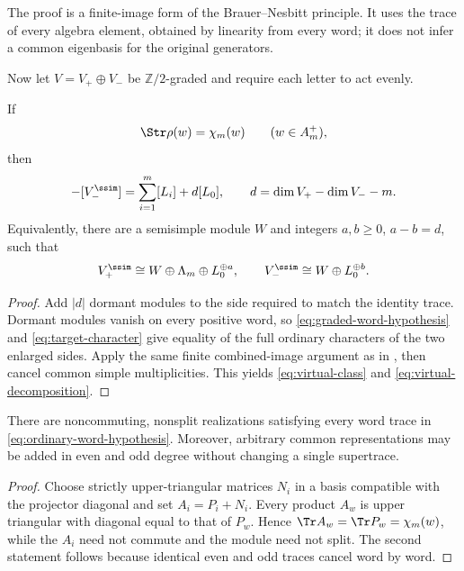 The proof is a finite-image form of the Brauer--Nesbitt principle.  It uses
the trace of every algebra element, obtained by linearity from every word; it
does not infer a common eigenbasis for the original generators.

Now let \(V=V_+\oplus V_-\) be \(\mathbb Z/2\)-graded and require each letter
to act evenly.

\begin{theorem}
\label{thm:graded-rigidity}
If
\begin{equation}
 \Str\rho(w)=\chi_m(w)\qquad(w\in A_m^+),
 \label{eq:graded-word-hypothesis}
\end{equation}
then
\begin{equation}
 [V_+^{\ssim}]-[V_-^{\ssim}]
 =\sum_{i=1}^m[L_i]+d[L_0],
 \qquad d=\dim V_+-\dim V_- -m.
 \label{eq:virtual-class}
\end{equation}
Equivalently, there are a semisimple module \(W\) and integers \(a,b\ge0\),
\(a-b=d\), such that
\begin{equation}
 V_+^{\ssim}\cong W\oplus\Lambda_m\oplus L_0^{\oplus a},
 \qquad
 V_-^{\ssim}\cong W\oplus L_0^{\oplus b}.
 \label{eq:virtual-decomposition}
\end{equation}
\end{theorem}

\begin{proof}
Add \(|d|\) dormant modules to the side required to match the identity trace.
Dormant modules vanish on every positive word, so
\eqref{eq:graded-word-hypothesis} and \eqref{eq:target-character} give equality
of the full ordinary characters of the two enlarged sides.  Apply the same
finite combined-image argument as in , then cancel
common simple multiplicities.  This yields
\eqref{eq:virtual-class} and \eqref{eq:virtual-decomposition}.
\end{proof}

\begin{proposition}
\label{prop:radical-counterexample}
There are noncommuting, nonsplit realizations satisfying every word trace in
\eqref{eq:ordinary-word-hypothesis}.  Moreover, arbitrary common
representations may be added in even and odd degree without changing a single
supertrace.
\end{proposition}

\begin{proof}
Choose strictly upper-triangular matrices \(N_i\) in a basis compatible with
the projector diagonal and set \(A_i=P_i+N_i\).  Every product \(A_w\) is upper
triangular with diagonal equal to that of \(P_w\).  Hence
\(\Tr A_w=\Tr P_w=\chi_m(w)\), while the \(A_i\) need not commute and the
module need not split.  The second statement follows because identical even
and odd traces cancel word by word.
\end{proof}

